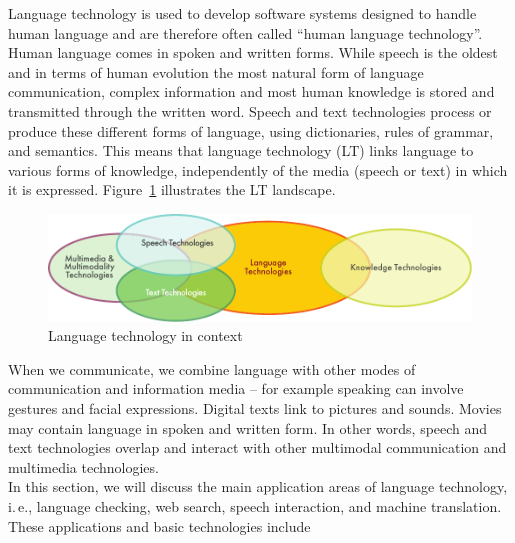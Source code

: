 \documentclass[]{../../metanetpaper}
\begin{document}
\clearpage



\begin{multicols}{2}

Language technology is used to develop software systems designed to handle human language and are therefore often called “human language technology”. Human language comes in spoken and written forms. While speech is the oldest and in terms of human evolution the most natural form of language communication, complex information and most human knowledge is stored and transmitted through the written word. Speech and text technologies process or produce these different forms of language, using dictionaries, rules of grammar, and semantics. This means that language technology (LT) links language to various forms of knowledge, independently of the media (speech or text) in which it is expressed. Figure~\ref{fig:ltincontext_en} illustrates the LT landscape.

\begin{figure}[htb]
  \center
  \includegraphics[width=\textwidth]{../_media/english/language_technologies}
  \caption{Language technology in context}
  \label{fig:ltincontext_en}
\end{figure}

When we communicate, we combine language with other modes of communication and information media – for example speaking can involve gestures and facial expressions. Digital texts link to pictures and sounds. Movies may contain language in spoken and written form. In other words, speech and text technologies overlap and interact with other multimodal communication and multimedia technologies.\\ 
In this section, we will discuss the main application areas of language technology, i.\,e., language checking, web search, speech interaction, and machine translation. These applications and basic technologies include 


\end{multicols}
\end{document}
